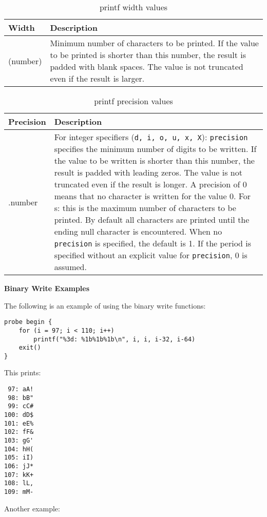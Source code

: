 \documentclass[twoside,english]{article}
\providecommand{\tabularnewline}{\\}
\newenvironment{vindent}
{\begin{list}{}{\setlength{\listparindent}{6pt}}
\item[]}
{\end{list}}
\begin{document}
\begin{table}[H]
\caption{printf width values}
\begin{tabular}{|>{\raggedright}p{1.5in}|>{\raggedright}p{4.5in}|}
\hline
\textbf{Width}&
\textbf{Description}\tabularnewline
\hline
\hline
(number)&
Minimum number of characters to be printed. If the value to be printed is
shorter than this number, the result is padded with blank spaces. The value
is not truncated even if the result is larger.\tabularnewline
\hline
\end{tabular}
\end{table}

%
\begin{table}[H]

\caption{printf precision values}

\begin{tabular}{|>{\raggedright}p{1.5in}|>{\raggedright}p{4.5in}|}
\hline
\textbf{Precision}&
\textbf{Description}\tabularnewline
\hline
\hline
.number&
For integer specifiers (\texttt{d, i, o, u, x, X}): \texttt{precision} specifies
the minimum number of digits to be written. If the value to be written is
shorter than this number, the result is padded with leading zeros. The value
is not truncated even if the result is longer. A precision of 0 means that
no character is written for the value 0. For s: this is the maximum number
of characters to be printed. By default all characters are printed until
the ending null character is encountered. When no \texttt{precision} is specified,
the default is 1. If the period is specified without an explicit value for
\texttt{precision}, 0 is assumed.\tabularnewline
\hline
\end{tabular}
\end{table}

\textbf{Binary Write Examples}

The following is an example of using the binary write functions:

\begin{vindent}
\begin{verbatim}
probe begin {
    for (i = 97; i < 110; i++)
        printf("%3d: %1b%1b%1b\n", i, i, i-32, i-64)
    exit()
}
\end{verbatim}
\end{vindent}
This prints:

\begin{vindent}
\begin{verbatim}
 97: aA!
 98: bB"
 99: cC#
100: dD$
101: eE%
102: fF&
103: gG'
104: hH(
105: iI)
106: jJ*
107: kK+
108: lL,
109: mM-
\end{verbatim}
\end{vindent}
Another example:
\end{document}
